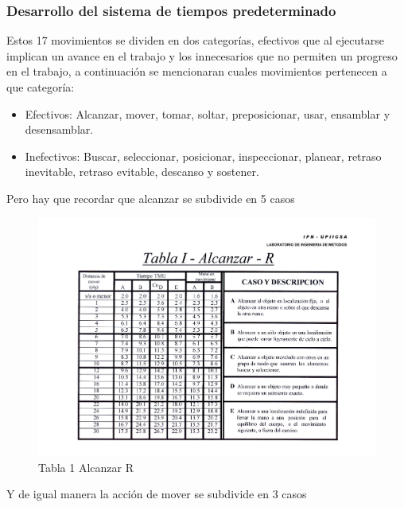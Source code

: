     \subsubsection{Desarrollo del sistema de tiempos predeterminado}
    Estos 17 movimientos se dividen en dos categorías, efectivos que al ejecutarse implican un avance en el trabajo y los innecesarios que no permiten un progreso en el trabajo, a continuación se mencionaran cuales movimientos pertenecen a que categoría: 
    \begin{itemize}
        \item Efectivos: Alcanzar, mover, tomar, soltar, preposicionar, usar, ensamblar y desensamblar.
        \item Inefectivos: Buscar, seleccionar, posicionar, inspeccionar, planear, retraso inevitable, retraso evitable, descanso y sostener.\cite{IngenieriaIndustrial}
    \end{itemize}
    
    Pero hay que recordar que alcanzar se subdivide en 5 casos
    
    \begin{figure}[H]
        \centering
        \includegraphics[scale=0.150]{21/img/tabla1AlcanzarR.pdf}
        \caption{Tabla 1 Alcanzar R}
        \label{fig:tabla1AlcanzarR}
    \end{figure}
    
    Y de igual manera la acción de mover se subdivide en 3 casos
    
